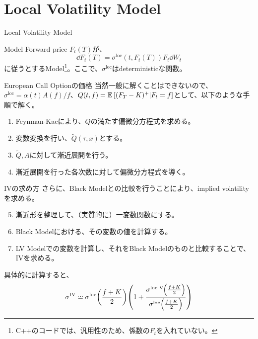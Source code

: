 \documentclass[dvipdfmx,9pt]{beamer}
\begin{document}
\section{Local Volatility Model}
\begin{frame}{Local Volatility Model}
  \begin{block}{Model}
    Forward price $F_{t}(T)$が、
    \begin{equation}
      \dd F_{t}(T) = \sigma^{\mathrm{loc}}(t,F_{t}(T)) F_{t} \dd W_{t}
    \end{equation}
    に従うとするModel\footnote{C++のコードでは、汎用性のため、係数の$F_{t}$を入れていない。}。ここで、$\sigma^{\mathrm{loc}}$はdeterministicな関数。
  \end{block}
  \begin{block}{European Call Optionの価格}
    当然一般に解くことはできないので、$\sigma^{\mathrm{loc}} = \alpha(t)A(f)/f$、$Q(t,f) = \exv[]{(F_{T} - K)^{+}|F_{t}=f}$として、以下のような手順で解く。
    \begin{enumerate}
      \item Feynman-Kacにより、$Q$の満たす偏微分方程式を求める。
      \item 変数変換を行い、$\tilde{Q}(\tau,x)$とする。
      \item $\tilde{Q},A$に対して漸近展開を行う。
      \item 漸近展開を行った各次数に対して偏微分方程式を導く。
    \end{enumerate}
  \end{block}
\end{frame}

\begin{frame}
  \begin{block}{IVの求め方}
    さらに、Black Modelとの比較を行うことにより、implied volatilityを求める。
    \begin{enumerate}
      \setcounter{enumi}{4}
      \item 漸近形を整理して、（実質的に）一変数関数にする。
      \item Black Modelにおける、その変数の値を計算する。
      \item LV Modelでの変数を計算し、それをBlack Modelのものと比較することで、IVを求める。
    \end{enumerate}
    具体的に計算すると、
    \begin{equation}
      \sigma^{\mathrm{IV}} \simeq \sigma^{\mathrm{loc}}\pqty{\frac{f+K}{2}}\pqty{1 + \frac{\sigma^{\mathrm{\mathrm{loc}}~\prime\prime}\pqty{\frac{f+K}{2}}}{\sigma^{\mathrm{loc}}\pqty{\frac{f+K}{2}}}}
    \end{equation}
  \end{block}
\end{frame}
\end{document}

